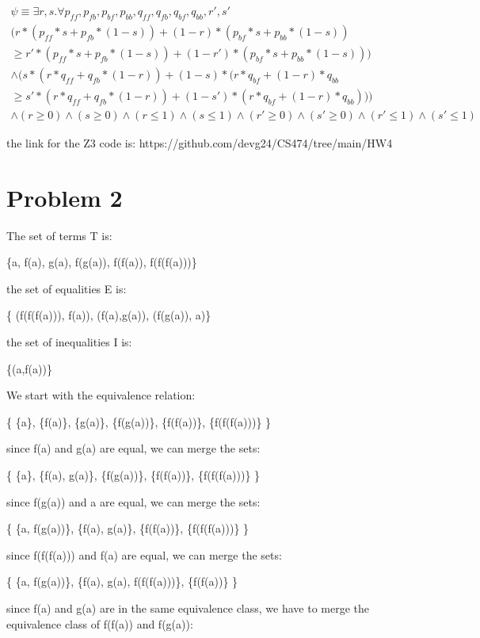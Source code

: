 \documentclass[12pt]{article}
\begin{document}
\begin {equation}
\begin{split}
    \psi \equiv \exists r,s . \forall p_{ff}, p_{fb}, p_{bf}, p_{bb}, q_{ff}, q_{fb}, q_{bf}, q_{bb}, r', s' \\ 
    (r*(p_{ff}*s + p_{fb}*(1-s)) + (1-r)*(p_{bf}*s + p_{bb}*(1-s)) \\ \geq r'*(p_{ff}*s + p_{fb}*(1-s)) + (1-r')*(p_{bf}*s + p_{bb}*(1-s))) \\ 
    \land (s*(r*q_{ff} + q_{fb} * (1-r)) + (1-s)*(r*q_{bf} + (1-r)*q_{bb} \\ \geq s'*(r*q_{ff} + q_{fb} * (1-r)) + (1-s')*(r*q_{bf} + (1-r)*q_{bb})))\\ \land (r \geq 0) \land (s \geq 0) \land (r \leq 1) \land (s \leq 1) \land (r' \geq 0) \land (s' \geq 0) \land (r' \leq 1) \land (s' \leq 1)
\end{split}
\end {equation}

the link for the Z3 code is: https://github.com/devg24/CS474/tree/main/HW4


\section*{Problem 2}

The set of terms T is:

\{a, f(a), g(a), f(g(a)), f(f(a)), f(f(f(a)))\}

the set of equalities E is:

\{ (f(f(f(a))), f(a)), (f(a),g(a)), (f(g(a)), a)\}

the set of inequalities I is:

\{(a,f(a))\}

We start with the equivalence relation:

\{ \{a\}, \{f(a)\}, \{g(a)\}, \{f(g(a))\}, \{f(f(a))\}, \{f(f(f(a)))\} \}

since f(a) and g(a) are equal, we can merge the sets:

\{ \{a\}, \{f(a), g(a)\}, \{f(g(a))\}, \{f(f(a))\}, \{f(f(f(a)))\} \}

since f(g(a)) and a are equal, we can merge the sets:

\{ \{a, f(g(a))\}, \{f(a), g(a)\}, \{f(f(a))\}, \{f(f(f(a)))\} \}

since f(f(f(a))) and f(a) are equal, we can merge the sets:

\{ \{a, f(g(a))\}, \{f(a), g(a), f(f(f(a)))\}, \{f(f(a))\} \}

since f(a) and g(a) are in the same equivalence class, we have to merge the equivalence class of f(f(a)) and f(g(a)):
\end{document}
